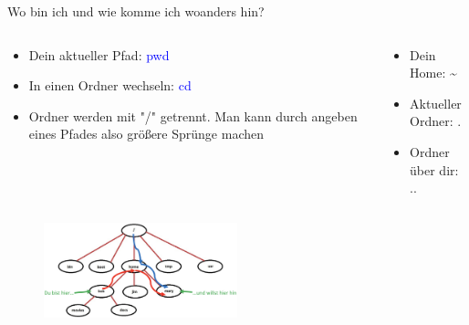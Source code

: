 \documentclass[t, xcolor=dvipsnames]{beamer}
\begin{document}
\begin{frame}{Wo bin ich und wie komme ich woanders hin?}
    \begin{columns}
	    \begin{column}{0.7\textwidth}
	        \begin{itemize}
	            \item Dein aktueller Pfad: \textcolor{blue}{pwd}
	            \item In einen Ordner wechseln: \textcolor{blue}{cd}
	            \item Ordner werden mit "/" getrennt. Man kann durch angeben eines Pfades also größere Sprünge machen
	        \end{itemize}
	        
	    \end{column}
	    \begin{column}{0.3\textwidth}
	
	    \begin{block}{}
	       \begin{itemize}
	           \item Dein Home: \textasciitilde
	           \item Aktueller Ordner: .
	           \item Ordner über dir: ..
	       \end{itemize}
	    \end{block}
    	
    	
    	
	    \end{column}
    \end{columns}
    
    \begin{figure}
	        \centering
	        \includegraphics[width=0.5\textwidth]{graphics/dateipfad}
	\end{figure}
    
\end{frame}
\end{document}

